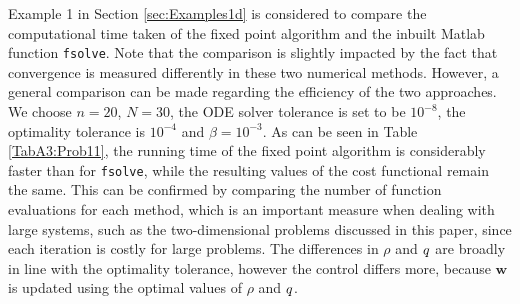 
Example 1 in Section \ref{sec:Examples1d} is considered to compare the computational time taken of the fixed point algorithm and the inbuilt Matlab function \texttt{fsolve}. Note that the comparison is slightly impacted by the fact that convergence is measured differently in these two numerical methods. However, a general comparison can be made regarding the efficiency of the two approaches.
We choose $n=20$, $N=30$, the ODE solver tolerance is set to be $10^{-8}$, the optimality tolerance is $10^{-4}$ and $\beta = 10^{-3}$. 
As can be seen in Table \ref{TabA3:Prob11}, the running time of the fixed point algorithm is considerably faster than for \texttt{fsolve}, while the resulting values of the cost functional remain the same. This can be confirmed by comparing the number of function evaluations for each method, which is an important measure when dealing with large systems, such as the two-dimensional problems discussed in this paper, since each iteration is costly for large problems. The differences in $\rho$ and $q$ are broadly in line with the optimality tolerance, however the control differs more, because $\mathbf{w}$ is updated using the optimal values of $\rho$ and $q$. 
%
 \label{TabA3:Prob11}
